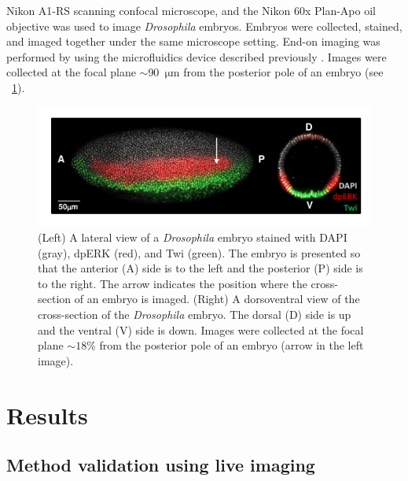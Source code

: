 %
Nikon A1-RS scanning confocal microscope, and the Nikon 60x Plan-Apo oil objective was used to image {\em Drosophila} embryos.
%
Embryos were collected, stained, and imaged together under the same microscope setting.
%
End-on imaging was performed by using the microfluidics device described previously \citep{chung2010microfluidic}.
%
Images were collected at the focal plane $\sim$90~$\mathrm{\mu m}$ from the posterior pole of an embryo (see \fig~\ref{fig:DV_view}).

\begin{figure}
\centering
\includegraphics{figS1}
\caption[Lateral and cross-sectional views of {\em Drosophila} embryo]{(Left) A lateral view of a {\it Drosophila} embryo stained with DAPI (gray), dpERK (red), and Twi (green). The embryo is presented so that the anterior (A) side is to the left and the posterior (P) side is to the right. The arrow indicates the position where the cross-section of an embryo is imaged. (Right) A dorsoventral view of the cross-section of the {\it Drosophila} embryo. The dorsal (D) side is up and the ventral (V) side is down. Images were collected at the focal plane $\sim 18\%$ from the posterior pole of an embryo (arrow in the left image). }
\label{fig:DV_view}
\end{figure}





\section{Results}



\subsection{Method validation using live imaging}

